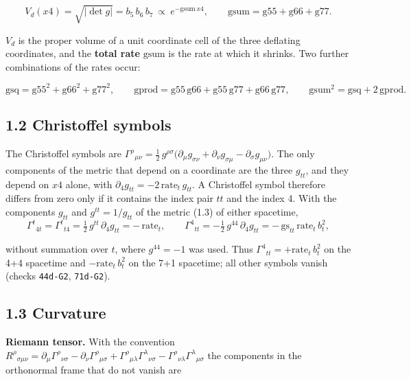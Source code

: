 \documentclass[
  10pt,
]{article}
\begin{document}
\[V_d(x4)=\sqrt{|\det g|}=b_5\,b_6\,b_7\ \propto\ e^{-\mathrm{gsum}\,x4},\qquad
\mathrm{gsum}=\mathrm{g55}+\mathrm{g66}+\mathrm{g77}.\tag{1.5}\]

\(V_d\) is the proper volume of a unit coordinate cell of the three
deflating coordinates, and the \textbf{total rate} \(\mathrm{gsum}\) is
the rate at which it shrinks. Two further combinations of the rates
occur:

\[\mathrm{gsq}=\mathrm{g55}^2+\mathrm{g66}^2+\mathrm{g77}^2,\qquad
\mathrm{gprod}=\mathrm{g55}\,\mathrm{g66}+\mathrm{g55}\,\mathrm{g77}+\mathrm{g66}\,\mathrm{g77},\qquad
\mathrm{gsum}^2=\mathrm{gsq}+2\,\mathrm{gprod}.\tag{1.6}\]

\hypertarget{christoffel-symbols}{%
\subsection{1.2 Christoffel symbols}\label{christoffel-symbols}}

The Christoffel symbols are
\(\Gamma^\rho{}_{\mu\nu}=\tfrac12\,g^{\rho\sigma}\big(\partial_\mu g_{\sigma\nu}+\partial_\nu g_{\sigma\mu}-\partial_\sigma g_{\mu\nu}\big)\).
The only components of the metric that depend on a coordinate are the
three \(g_{tt}\), and they depend on \(x4\) alone, with
\(\partial_4 g_{tt}=-2\,\mathrm{rate}_t\,g_{tt}\). A Christoffel symbol
therefore differs from zero only if it contains the index pair \(tt\)
and the index 4. With the components \(g_{tt}\) and \(g^{tt}=1/g_{tt}\)
of the metric (1.3) of either spacetime,
\[\Gamma^t{}_{4t}=\Gamma^t{}_{t4}=\tfrac12\,g^{tt}\,\partial_4g_{tt}=-\,\mathrm{rate}_t,\qquad
\Gamma^4{}_{tt}=-\tfrac12\,g^{44}\,\partial_4g_{tt}=-\,\mathrm{gs}_{tt}\,\mathrm{rate}_t\,b_t^2,\tag{1.7}\]

without summation over \(t\), where \(g^{44}=-1\) was used. Thus
\(\Gamma^4{}_{tt}=+\mathrm{rate}_t\,b_t^2\) on the 4+4 spacetime and
\(-\mathrm{rate}_t\,b_t^2\) on the 7+1 spacetime; all other symbols
vanish (checks \texttt{44d-G2}, \texttt{71d-G2}).

\hypertarget{curvature}{%
\subsection{1.3 Curvature}\label{curvature}}

\textbf{Riemann tensor.} With the convention
\(R^\rho{}_{\sigma\mu\nu}=\partial_\mu\Gamma^\rho{}_{\nu\sigma}-\partial_\nu\Gamma^\rho{}_{\mu\sigma}+\Gamma^\rho{}_{\mu\lambda}\Gamma^\lambda{}_{\nu\sigma}-\Gamma^\rho{}_{\nu\lambda}\Gamma^\lambda{}_{\mu\sigma}\)
the components in the orthonormal frame that do not vanish are
\end{document}
